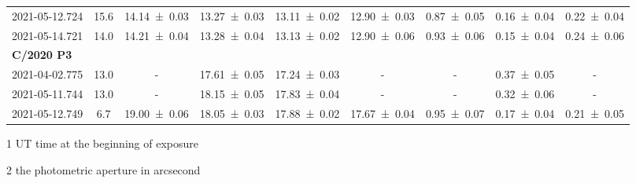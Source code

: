 \begin{table}
\begin{threeparttable}
{\begin{tabular}{ccccccccc}
            2021-05-12.724 & \num{15.6} & \num{14.14 +- 0.03} & \num{13.27 +- 0.03} & \num{13.11 +- 0.02} & \num{12.90 +- 0.03} & \num{0.87 +- 0.05} & \num{0.16 +- 0.04} & \num{0.22 +- 0.04} \\
            2021-05-14.721 & \num{14.0} & \num{14.21 +- 0.04} & \num{13.28 +- 0.04} & \num{13.13 +- 0.02} & \num{12.90 +- 0.06} & \num{0.93 +- 0.06} & \num{0.15 +- 0.04} & \num{0.24 +- 0.06} \\
            \multicolumn{9}{l}{\textbf{C/2020 P3}} \\
            2021-04-02.775 & \num{13.0} & - & \num{17.61 +- 0.05} & \num{17.24 +- 0.03} & - & - & \num{0.37 +- 0.05} & - \\
            2021-05-11.744 & \num{13.0} & - & \num{18.15 +- 0.05} & \num{17.83 +- 0.04} & - & - & \num{0.32 +- 0.06} & - \\
            2021-05-12.749 & \num{6.7} & \num{19.00 +- 0.06} & \num{18.05 +- 0.03} & \num{17.88 +- 0.02} & \num{17.67 +- 0.04} & \num{0.95 +- 0.07} & \num{0.17 +- 0.04} & \num{0.21 +- 0.05} \\
            \bottomrule
        \end{tabular}
        }
        \begin{tablenotes}
            \item[1] UT time at the beginning of exposure
            \item[2] the photometric aperture in arcsecond
        \end{tablenotes}
    \end{threeparttable}
\end{table}


